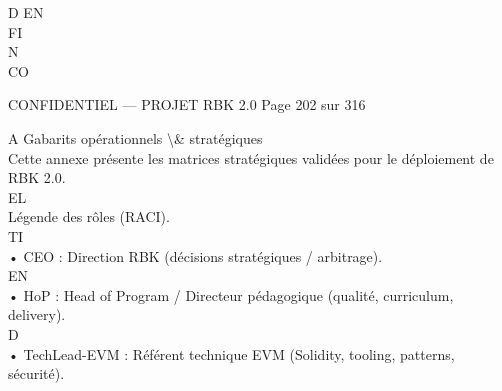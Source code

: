 D    EN\\
FI\\
N\\
CO\\
\vspace{0.5em}
\vspace{0.5em}
\vspace{0.5em}
\vspace{0.5em}
\begin{confidential}CONFIDENTIEL — PROJET RBK 2.0                                Page 202 sur 316\end{confidential}
A \textbar{} Gabarits opérationnels \textbackslash{}& stratégiques\\
\vspace{0.5em}
\vspace{0.5em}
Cette annexe présente les matrices stratégiques validées pour le déploiement de RBK 2.0.\\
\vspace{0.5em}
\vspace{0.5em}
\vspace{0.5em}
\vspace{0.5em}
EL\\
Légende des rôles (RACI).\\
\vspace{0.5em}
\vspace{0.5em}
\vspace{0.5em}
\vspace{0.5em}
TI\\
• CEO : Direction RBK (décisions stratégiques / arbitrage).\\
\vspace{0.5em}
\vspace{0.5em}
\vspace{0.5em}
\vspace{0.5em}
EN\\
• HoP : Head of Program / Directeur pédagogique (qualité, curriculum, delivery).\\
\vspace{0.5em}
\vspace{0.5em}
\vspace{0.5em}
\vspace{0.5em}
D\\
• TechLead-EVM : Référent technique EVM (Solidity, tooling, patterns, sécurité).\\
\vspace{0.5em}
\vspace{0.5em}
\vspace{0.5em}
\vspace{0.5em}
